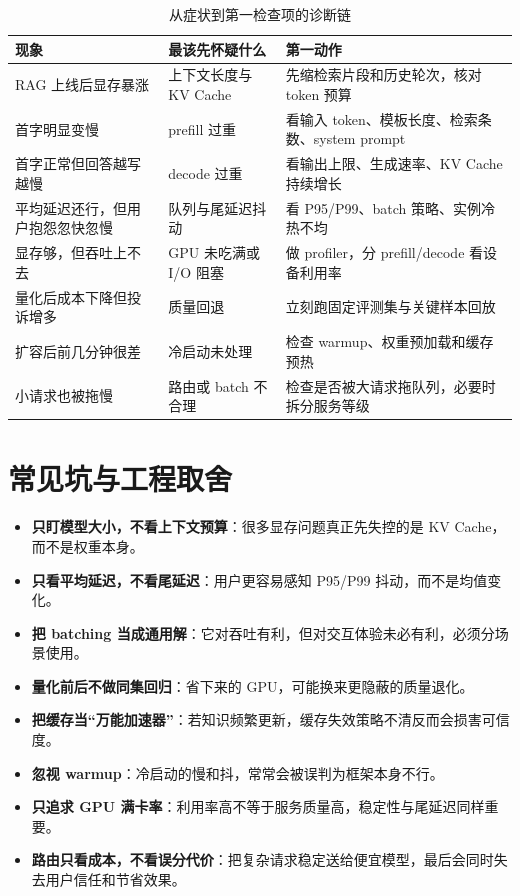 \begin{table}[H]
\centering
\small
\begin{tabularx}{\textwidth}{>{\raggedright\arraybackslash}p{3cm}>{\raggedright\arraybackslash}p{3.6cm}>{\raggedright\arraybackslash}X}
\toprule
\textbf{现象} & \textbf{最该先怀疑什么} & \textbf{第一动作} \\
\midrule
RAG 上线后显存暴涨 & 上下文长度与 KV Cache & 先缩检索片段和历史轮次，核对 token 预算 \\
首字明显变慢 & prefill 过重 & 看输入 token、模板长度、检索条数、system prompt \\
首字正常但回答越写越慢 & decode 过重 & 看输出上限、生成速率、KV Cache 持续增长 \\
平均延迟还行，但用户抱怨忽快忽慢 & 队列与尾延迟抖动 & 看 P95/P99、batch 策略、实例冷热不均 \\
显存够，但吞吐上不去 & GPU 未吃满或 I/O 阻塞 & 做 profiler，分 prefill/decode 看设备利用率 \\
量化后成本下降但投诉增多 & 质量回退 & 立刻跑固定评测集与关键样本回放 \\
扩容后前几分钟很差 & 冷启动未处理 & 检查 warmup、权重预加载和缓存预热 \\
小请求也被拖慢 & 路由或 batch 不合理 & 检查是否被大请求拖队列，必要时拆分服务等级 \\
\bottomrule
\end{tabularx}
\caption{从症状到第一检查项的诊断链}
\label{tab:inference-diagnosis}
\end{table}

\section{常见坑与工程取舍}
\begin{itemize}
  \item \textbf{只盯模型大小，不看上下文预算}：很多显存问题真正先失控的是 KV Cache，而不是权重本身。
  \item \textbf{只看平均延迟，不看尾延迟}：用户更容易感知 P95/P99 抖动，而不是均值变化。
  \item \textbf{把 batching 当成通用解}：它对吞吐有利，但对交互体验未必有利，必须分场景使用。
  \item \textbf{量化前后不做同集回归}：省下来的 GPU，可能换来更隐蔽的质量退化。
  \item \textbf{把缓存当“万能加速器”}：若知识频繁更新，缓存失效策略不清反而会损害可信度。
  \item \textbf{忽视 warmup}：冷启动的慢和抖，常常会被误判为框架本身不行。
  \item \textbf{只追求 GPU 满卡率}：利用率高不等于服务质量高，稳定性与尾延迟同样重要。
  \item \textbf{路由只看成本，不看误分代价}：把复杂请求稳定送给便宜模型，最后会同时失去用户信任和节省效果。
\end{itemize}

